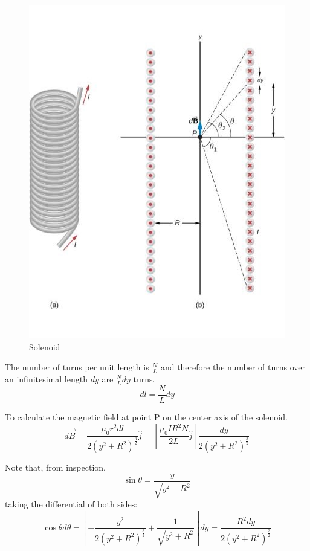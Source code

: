 \documentclass[14pt]{memoir}
\begin{document}
\begin{figure}[H]
\begin{center}
\includegraphics[scale=0.5]{fig/fig_12_19.jpg}
\caption{Solenoid}
\label{fig:12_19}
\end{center}
\end{figure}

The number of turns per unit length is $\frac{N}{L}$ and therefore the number of turns over an infinitesimal length $dy$ are $\frac{N}{L} dy$ turns.
\begin{equation}
dl = \frac{N}{L} dy
\end{equation}

To calculate the magnetic field at point P on the center axis of the solenoid. 
\begin{equation}
d \vec{B} = \frac{\mu_0 r^2 dl}{2(y^2 + R^2)^{\frac{3}{2}}} \hat{j} = [\frac{\mu_0 I R^2 N}{2L} \hat{j}] \frac{dy}{2(y^2 + R^2)^{\frac{3}{2}}}
\end{equation}


Note that, from inspection,
\begin{equation}
\sin{\theta} = \frac{y}{\sqrt{y^2 + R^2}}
\end{equation}
taking the differential of both sides:
\begin{equation}
\cos{\theta} d\theta = [-\frac{y^2}{2(y^2 + R^2)^{\frac{3}{2}}} + \frac{1}{\sqrt{y^2 + R^2}}] dy = \frac{R^2 dy}{2(y^2 + R^2)^{\frac{3}{2}}}
\end{equation}
\end{document}
